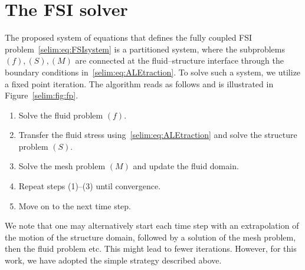 \section{The FSI solver}
\label{selim:sec:primalsolver}

The proposed system of equations that defines the fully coupled FSI
problem~\eqref{selim:eq:FSIsystem} is a partitioned system, where the
subproblems $(f),(S),(M)$ are connected at the fluid--structure
interface through the boundary conditions
in~\eqref{selim:eq:ALEtraction}. To solve such a system, we utilize a
fixed point iteration. The algorithm reads as follows and is
illustrated in Figure~\ref{selim:fig:fp}.

\begin{enumerate}
\item
Solve the fluid problem $(f)$.
\item
Transfer the fluid stress using~\eqref{selim:eq:ALEtraction} and
solve the structure problem $(S)$.
\item
Solve the mesh problem $(M)$ and update the fluid domain.
\item
Repeat steps (1)--(3) until convergence.
\item
Move on to the next time step.
\end{enumerate}

We note that one may alternatively start each time step with an
extrapolation of the motion of the structure domain, followed by a
solution of the mesh problem, then the fluid problem etc. This might
lead to fewer iterations. However, for this work, we have adopted the
simple strategy described above.

